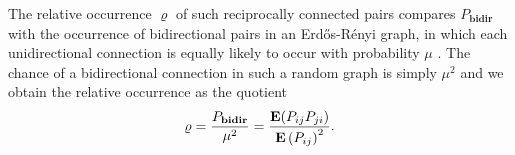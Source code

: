 The relative occurrence $\varrho$ of such reciprocally connected pairs compares $P_{\mathbf{bidir}}$ with the occurrence of bidirectional pairs in an Erd\H{o}s-R\'{e}nyi graph, in which each unidirectional connection is equally likely to occur with probability $\mu$ \cite{Gilbert1959, Erdos1959}. The chance of a bidirectional connection in such a random graph is simply $\mu^2$ and we obtain the relative occurrence as the quotient
\begin{align}
\varrho = \frac{P_{\mathbf{bidir}}}{\mu^2} = \frac{\operatorname{\mathbf{E}}(P_{ij}P_{ji})}{{\operatorname{\mathbf{E}}\left(P_{ij}\right)}^2}.
\end{align}

